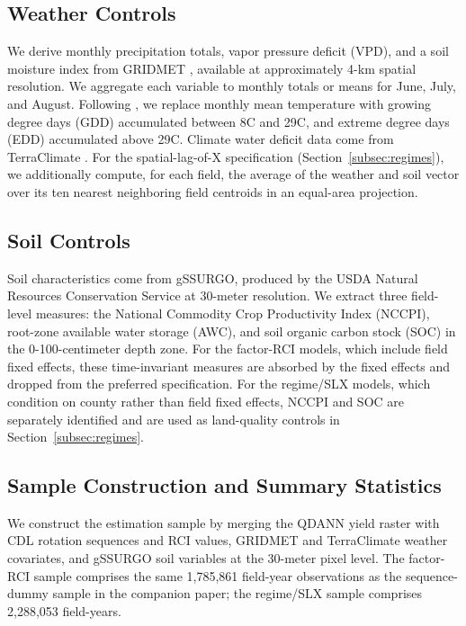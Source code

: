\documentclass[12pt,letterpaper]{article}
\theoremstyle{remark}
\theoremstyle{remark}
\theoremstyle{plain}
\theoremstyle{definition}
\begin{document}
\subsection{\label{subsec:w_controls}Weather Controls}
We derive monthly precipitation totals, vapor pressure deficit (VPD), and a soil moisture index from GRIDMET \citep{Abatzoglou2013}, available at approximately 4-km spatial resolution. We aggregate each variable to monthly totals or means for June, July, and August. Following \citet{SchlenkerRoberts2009}, we replace monthly mean temperature with growing degree days (GDD) accumulated between 8\textdegree C and 29\textdegree C, and extreme degree days (EDD) accumulated above 29\textdegree C. Climate water deficit data come from TerraClimate \citep{Abatzoglou2018}. For the spatial-lag-of-X specification (Section~\ref{subsec:regimes}), we additionally compute, for each field, the average of the weather and soil vector over its ten nearest neighboring field centroids in an equal-area projection.

\subsection{\label{subsec:soil_controls}Soil Controls}
Soil characteristics come from gSSURGO, produced by the USDA Natural Resources Conservation Service at 30-meter resolution. We extract three field-level measures: the National Commodity Crop Productivity Index (NCCPI), root-zone available water storage (AWC), and soil organic carbon stock (SOC) in the 0-100-centimeter depth zone. For the factor-RCI models, which include field fixed effects, these time-invariant measures are absorbed by the fixed effects and dropped from the preferred specification. For the regime/SLX models, which condition on county rather than field fixed effects, NCCPI and SOC are separately identified and are used as land-quality controls in Section~\ref{subsec:regimes}.

\subsection{\label{subsec:smaple_const}Sample Construction and Summary Statistics}
We construct the estimation sample by merging the QDANN yield raster with CDL rotation sequences and RCI values, GRIDMET and TerraClimate weather covariates, and gSSURGO soil variables at the 30-meter pixel level. The factor-RCI sample comprises the same 1,785,861 field-year observations as the sequence-dummy sample in the companion paper; the regime/SLX sample comprises 2,288,053 field-years.
\end{document}

